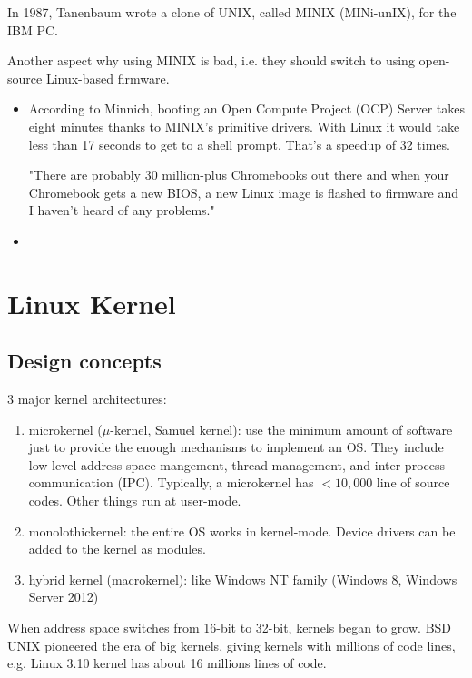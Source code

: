In 1987, Tanenbaum wrote a clone of UNIX, called MINIX (MINi-unIX), for the IBM PC. 


Another aspect why using MINIX is bad, i.e. they should switch to using open-source Linux-based firmware.
\begin{itemize}
  
  \item  According to Minnich, booting an Open Compute Project (OCP) Server
  takes eight minutes thanks to MINIX's primitive drivers. With Linux it would
  take less than 17 seconds to get to a shell prompt. That's a speedup of 32
  times.
  
  "There are probably 30 million-plus Chromebooks out there and when your
  Chromebook gets a new BIOS, a new Linux image is flashed to firmware and I
  haven't heard of any problems."
  
  \item 
  
  
\end{itemize}


\chapter{Linux Kernel}

\section{Design concepts}


\begin{framed}
3 major kernel architectures:
\begin{enumerate}
  \item microkernel ($\mu$-kernel, Samuel kernel): use the minimum amount of
  software just to provide the enough mechanisms to implement an OS. They
  include low-level address-space mangement, thread management, and
  inter-process communication (IPC). Typically, a microkernel has $< 10,000$
  line of source codes. Other things run at user-mode.
  \item monolothickernel: the entire OS works in kernel-mode. Device
  drivers can be added to the kernel as modules.
  \item hybrid kernel (macrokernel): like Windows NT family (Windows 8, Windows
  Server 2012)
\end{enumerate}
When address space switches from 16-bit to 32-bit, kernels began to grow. BSD
UNIX pioneered the era of big kernels, giving kernels with millions of code
lines, e.g. Linux 3.10 kernel has about 16 millions lines of code.
\end{framed}


